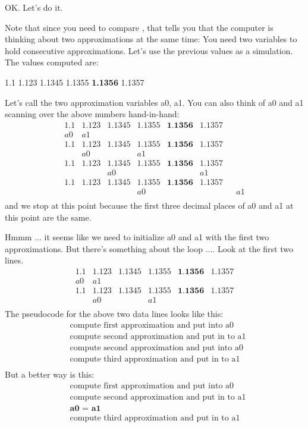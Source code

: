 OK. Let's do it.

Note that since you need to compare , that tells you that the computer is thinking about two
approximations at the same time: You need two variables to hold
consecutive approximations. Let's use the previous
values as a simulation. The values computed are:
\begin{center}
1.1 1.123 1.1345 1.1355 \textbf{1.1356} 1.1357
\end{center}
Let's call the two approximation variables a0, a1. You
can also think of a0 and a1 scanning over the above numbers
hand-in-hand:
\begin{align*}
1.1 &1.123 &1.1345 &1.1355 &\textbf{1.1356} &1.1357\\
a0 &a1\\
1.1 &1.123 &1.1345 &1.1355 &\textbf{1.1356} &1.1357\\
&a0 &&a1\\
1.1 &1.123 &1.1345 &1.1355 &\textbf{1.1356} &1.1357\\
&&a0 &&&a1\\
1.1 &1.123 &1.1345 &1.1355 &\textbf{1.1356} &1.1357\\
&&&a0 &&&&a1\\
\end{align*}
and we stop at this point because the first three decimal places of a0
and a1 at this point are the same.

Hmmm ... it seems like we need to initialize a0 and a1 with the first
two approximations. But there's something about the loop
.... Look at the first two lines.
\begin{align*}
1.1 &1.123 &1.1345 &1.1355 &\textbf{1.1356} &1.1357\\
a0 &a1\\
1.1 &1.123 &1.1345 &1.1355 &\textbf{1.1356} &1.1357\\
&a0 &&a1\\
\end{align*}
The pseudocode for the above two data lines looks like this:
\begin{align*}
&\text{compute first approximation and put into a0}\\
&\text{compute second approximation and put in to a1}\\
&\text{compute second approximation and put into a0}\\
&\text{compute third approximation and put in to a1}\\
\end{align*}
But a better way is this:
\begin{align*}
&\text{compute first approximation and put into a0}\\
&\text{compute second approximation and put in to a1}\\
&\textbf{a0 = a1}\\
&\text{compute third approximation and put in to a1}\\
\end{align*}

